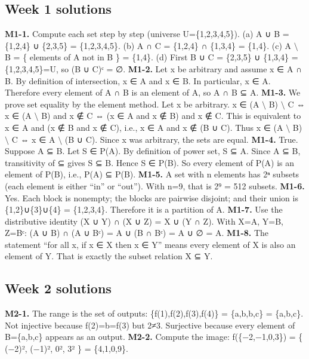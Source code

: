 \documentclass[11pt]{article}
\begin{document}
\subsection{Week 1 solutions}
\textbf{M1-1.} Compute each set step by step (universe U=\{1,2,3,4,5\}).
(a) A ∪ B = \{1,2,4\} ∪ \{2,3,5\} = \{1,2,3,4,5\}.
(b) A ∩ C = \{1,2,4\} ∩ \{1,3,4\} = \{1,4\}.
(c) A \(\setminus\) B = \{ elements of A not in B \} = \{1,4\}.
(d) First B ∪ C = \{2,3,5\} ∪ \{1,3,4\} = \{1,2,3,4,5\}=U, so (B ∪ C)ᶜ = ∅.
\textbf{M1-2.} Let x be arbitrary and assume x ∈ A ∩ B. By definition of intersection, x ∈ A and x ∈
B. In particular, x ∈ A. Therefore every element of A ∩ B is an element of A, so A ∩ B ⊆ A.
\textbf{M1-3.} We prove set equality by the element method. Let x be arbitrary.
x ∈ (A \(\setminus\) B) \(\setminus\) C ⇔ x ∈ (A \(\setminus\) B) and x ∉ C ⇔ (x ∈ A and x ∉ B) and x ∉ C.
This is equivalent to x ∈ A and (x ∉ B and x ∉ C), i.e., x ∈ A and x ∉ (B ∪ C).
Thus x ∈ (A \(\setminus\) B) \(\setminus\) C ⇔ x ∈ A \(\setminus\) (B ∪ C). Since x was arbitrary, the sets are equal.
\textbf{M1-4.} True. Suppose A ⊆ B. Let S ∈ P(A). By definition of power set, S ⊆ A. Since A ⊆ B,
transitivity of ⊆ gives S ⊆ B. Hence S ∈ P(B).
So every element of P(A) is an element of P(B), i.e., P(A) ⊆ P(B).
\textbf{M1-5.} A set with n elements has 2ⁿ subsets (each element is either “in” or “out”). With
n=9, that is 2⁹ = 512 subsets.
\textbf{M1-6.} Yes. Each block is nonempty; the blocks are pairwise disjoint; and their union is
\{1,2\}∪\{3\}∪\{4\} = \{1,2,3,4\}. Therefore it is a partition of A.
\textbf{M1-7.} Use the distributive identity (X ∪ Y) ∩ (X ∪ Z) = X ∪ (Y ∩ Z). With X=A, Y=B, Z=Bᶜ:
(A ∪ B) ∩ (A ∪ Bᶜ) = A ∪ (B ∩ Bᶜ) = A ∪ ∅ = A.
\textbf{M1-8.} The statement “for all x, if x ∈ X then x ∈ Y” means every element of X is also an
element of Y. That is exactly the subset relation X ⊆ Y.
\subsection{Week 2 solutions}
\textbf{M2-1.} The range is the set of outputs: \{f(1),f(2),f(3),f(4)\} = \{a,b,b,c\} = \{a,b,c\}.
Not injective because f(2)=b=f(3) but 2≠3.
Surjective because every element of B=\{a,b,c\} appears as an output.
\textbf{M2-2.} Compute the image: f(\{−2,−1,0,3\}) = \{ (−2)², (−1)², 0², 3² \} = \{4,1,0,9\}.
\end{document}
